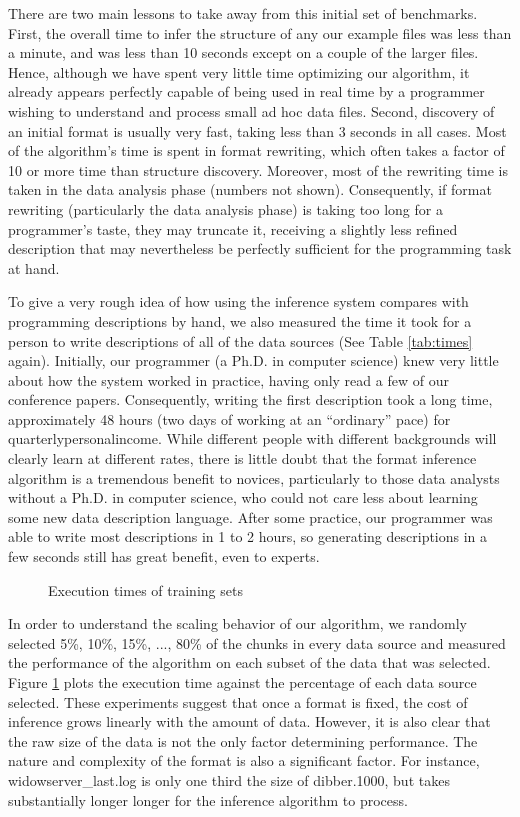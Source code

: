 There are two main lessons to take away from this initial set of
benchmarks.  First, the overall time to infer the structure of any our
example files was less than a minute, and was less than 10 seconds
except on a couple of the larger files.  Hence, although we have spent
very little time optimizing our algorithm, it already appears
perfectly capable of being used in real time by a programmer wishing
to understand and process small ad hoc data files.  Second, discovery
of an initial format is usually very fast, taking less than 3 seconds
in all cases.  Most of the algorithm's time is spent in format rewriting, which
often takes a factor of 10 or more time than structure discovery.  Moreover, most of the
rewriting time is taken in the data analysis phase (numbers not
shown).  Consequently, if format rewriting (particularly the data analysis phase)
is taking too long for a programmer's taste, they may truncate it, receiving a 
slightly less refined description that may nevertheless be perfectly sufficient
for the programming task at hand.

To give a very rough idea of how using the inference system compares with programming
descriptions by hand, we also measured the time it took for a person to write descriptions of
all of the data sources (See Table \ref{tab:times} again).  
Initially, our programmer (a Ph.D. in computer science)
knew very little about how the \pads{} system
worked in practice, having only read a few of our conference papers.  Consequently, writing
the first description took a long time, approximately 48 hours (two days of working at
an ``ordinary'' pace) for quarterlypersonalincome.  While different people with different 
backgrounds will clearly learn at different rates, there is little doubt that the
format inference algorithm is a tremendous benefit to novices, particularly
to those data analysts without a Ph.D. in computer science, who could not care less about
learning some new data description language.  After some practice, our programmer was
able to write most descriptions in 1 to 2 hours, so generating descriptions in a few
seconds still has great benefit, even to experts.

\begin{figure}
\caption{Execution times of training sets} \label{fig:traintime} \shrink
\end{figure}

In order to understand the scaling behavior of our algorithm, we
randomly selected 5\%, 10\%, 15\%, ..., 80\% of the chunks in every data source
and measured the performance of the algorithm on each subset of the data that was
selected. Figure \ref{fig:traintime}
plots the execution time against the percentage of each data source selected.
These experiments suggest that once a format is fixed, the cost of inference
grows linearly with the amount of data.  However, it is also clear that the raw
size of the data is not the only factor determining performance.  The nature and complexity
of the format is also a significant factor.  For instance, widowserver\_last.log
is only one third the size of dibber.1000, but takes substantially longer longer
for the inference algorithm to process.

